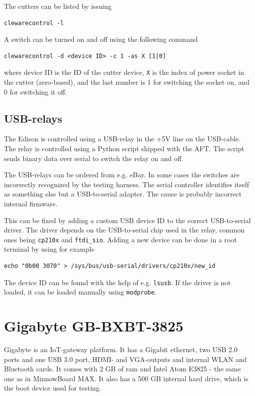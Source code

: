 \documentclass[a4paper,11pt]{article}
\newcommand{\cmd}[1]{\texttt{#1}}
\begin{document}
The cutters can be listed by issuing
\begin{lstlisting}
clewarecontrol -l
\end{lstlisting}

A switch can be turned on and off using the following command
\begin{lstlisting}
clewarecontrol -d <device ID> -c 1 -as X [1|0]
\end{lstlisting}
where device ID is the ID of the cutter device, \cmd{X} is the index of power socket in the cutter (zero-based), and the last number is 1 for switching the socket on, and 0 for switching it off.

\subsection{USB-relays}
The Edison is controlled using a USB-relay in the +5V line on the USB-cable. The relay is controlled using a Python script shipped with the AFT. The script sends binary data over serial to switch the relay on and off.

The USB-relays can be ordered from e.g. eBay. In some cases the switches are incorrectly recognized by the testing harness. The serial controller identifies itself as something else but a USB-to-serial adapter. The cause is probably incorrect internal firmware.

This can be fixed by adding a custom USB device ID to the correct USB-to-serial driver. The driver depends on the USB-to-serial chip used in the relay, common ones being \cmd{cp210x} and \cmd{ftdi\_sio}. Adding a new device can be done in a root terminal by using for example
\begin{lstlisting}
echo "0b00 3070" > /sys/bus/usb-serial/drivers/cp210x/new_id
\end{lstlisting}
The device ID can be found with the help of e.g. \cmd{lsusb}. If the driver is not loaded, it can be loaded manually using \cmd{modprobe}.

\section{Gigabyte GB-BXBT-3825}
\label{gigabyte}

Gigabyte is an IoT-gateway platform. It has a Gigabit ethernet, two USB 2.0 ports and one USB 3.0 port, HDMI- and VGA-outputs and internal WLAN and Bluetooth cards. It comes with 2 GB of ram and Intel Atom E3825 - the same one as in MinnowBoard MAX. It also has a 500 GB internal hard drive, which is the boot device used for testing.
\end{document}
